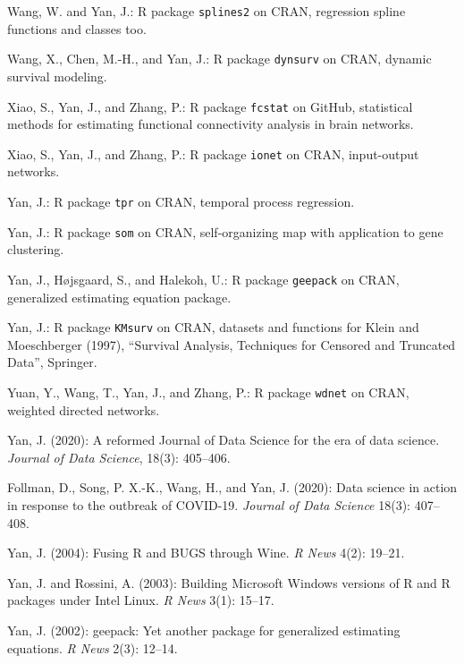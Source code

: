 \documentclass[Statistics]{vita}
\begin{document}
\begin{vita}
\begin{Publications}
\begin{Software}
  \item *Wang, W. and Yan, J.: R package \texttt{splines2} on CRAN, regression spline functions and classes too.
  \item *Wang, X., Chen, M.-H., and Yan, J.: R package \texttt{dynsurv} on CRAN, dynamic survival modeling.
  \item *Xiao, S., Yan, J., and Zhang, P.: R package \texttt{fcstat} on GitHub, statistical methods for estimating functional connectivity analysis in brain networks.
  \item *Xiao, S., Yan, J., and Zhang, P.: R package \texttt{ionet} on CRAN, input-output networks.
  \item Yan, J.: R package \texttt{tpr} on CRAN, temporal process regression.
  \item Yan, J.: R package \texttt{som} on CRAN, self-organizing map with application to gene clustering.
  \item Yan, J., H\o{}jsgaard, S., and Halekoh, U.: R package \texttt{geepack} on CRAN, generalized estimating equation package.
  \item Yan, J.: R package \texttt{KMsurv} on CRAN,  datasets and functions for Klein and Moeschberger (1997), ``Survival Analysis, Techniques for Censored and Truncated Data'', Springer.
  \item *Yuan, Y., Wang, T., Yan, J., and Zhang, P.: R package \texttt{wdnet} on CRAN, weighted directed networks.
  \end{Software}
  \begin{NonRefereedPublications}
  \item Yan, J. (2020): A reformed Journal of Data Science for the era of data science. {\em Journal of Data Science\/}, 18(3): 405--406.
  \item Follman, D., Song, P. X.-K., Wang, H., and Yan, J. (2020): Data science in action in response to the outbreak of COVID-19. {\em Journal of Data Science\/} 18(3): 407--408.
  \item Yan, J. (2004): Fusing {R} and {BUGS} through {Wine}. {\em R News\/} 4(2): 19--21.
  \item Yan, J. and Rossini, A. (2003): Building {M}icrosoft {W}indows versions of {R} and {R} packages under {I}ntel {L}inux. {\em R News\/} 3(1): 15--17.
  \item Yan, J. (2002): geepack: Yet another package for generalized estimating equations. {\em R News\/} 2(3): 12--14.

\end{NonRefereedPublications}
\end{Publications}
\end{vita}
\end{document}
